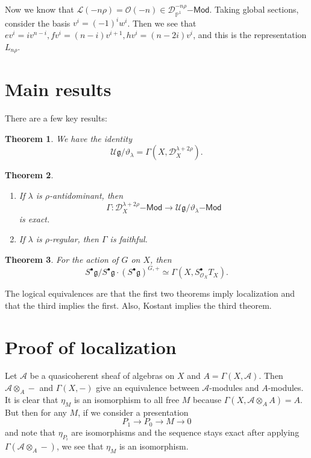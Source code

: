 \documentclass[leqno, openany]{memoir}
\newtheorem{thm}{Theorem}[section]
\theoremstyle{definition}
\theoremstyle{remark}
\theoremstyle{plain}
\theoremstyle{definition}
\theoremstyle{remark}
\renewcommand{\P}{\mathbb{P}}
\newcommand{\g}{\mathfrak{g}}
\newcommand{\mc}[1]{\mathcal{#1}}
\newcommand{\ms}[1]{\mathsf{#1}}
\begin{document}
Now we know that $\mc{L}(-n\rho) = \mc{O}(-n) \in \mc{D}_{\P^1}^{-n\rho}\ms{-Mod}$. Taking global sections, consider the basis $v^i = (-1)^i w^i$. Then we see that $e v^i = i v^{n-i}, f v^i = (n-i) v^{i+1}, h v^i = (n-2i) v^i$, and this is the representation $L_{n\rho}$.

\section{Main results}

There are a few key results:

\begin{thm}
    We have the identity
    \[ \mc{U} \g / \vartheta_{\lambda} = \Gamma(X, \mc{D}_X^{\lambda + 2\rho}). \]
\end{thm}

\begin{thm}\leavevmode
    \begin{enumerate}
        \item If $\lambda$ is $\rho$-antidominant, then
            \[ \Gamma \colon \mc{D}_X^{\lambda+2\rho}\ms{-Mod} \to \mc{U}\g / \vartheta_{\lambda}\ms{-Mod} \]
            is exact.
        \item If $\lambda$ is $\rho$-regular, then $\Gamma$ is faithful.
    \end{enumerate}
\end{thm}

\begin{thm}
    For the action of $G$ on $X$, then
    \[ S^{\bullet} \g / S^{\bullet} \g \cdot (S^{\bullet} \g)^{G,+} \simeq \Gamma(X, S^{\bullet}_{\mc{O}_X} T_X). \]
\end{thm}

The logical equivalences are that the first two theorems imply localization and that the third implies the first. Also, Kostant implies the third theorem.

\section{Proof of localization}
Let $\mc{A}$ be a quasicoherent sheaf of algebras on $X$ and $A = \Gamma(X, \mc{A})$. Then $\mc{A} \otimes_A -$ and $\Gamma(X, -)$ give an equivalence between $\mc{A}$-modules and $A$-modules. It is clear that $\eta_M$ is an isomorphism to all free $M$ because $\Gamma(X, \mc{A} \otimes_A A) = A$. But then for any $M$, if we consider a presentation
\[ P_1 \to P_0 \to M \to 0 \]
and note that $\eta_{P_i}$ are isomorphisms and the sequence stays exact after applying $\Gamma(\mc{A} \otimes_A -)$, we see that $\eta_M$ is an isomorphism.
\end{document}
